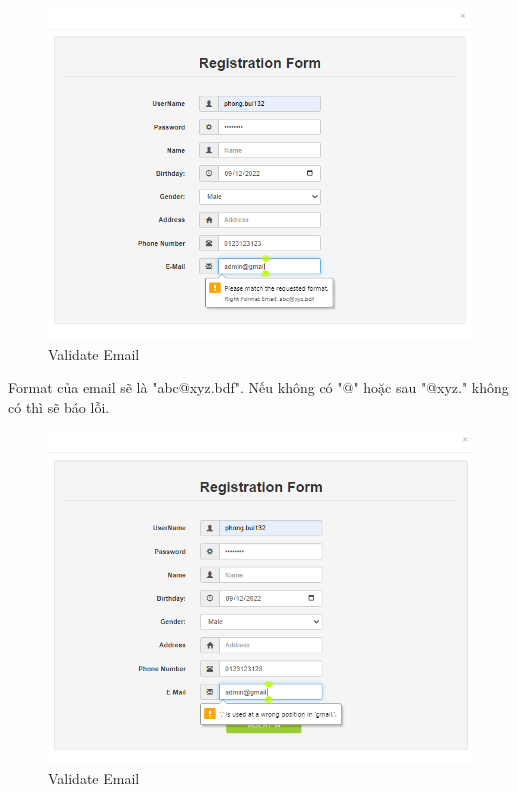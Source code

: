 \begin{figure}[H]
    \centering
    \includegraphics[scale=0.45]{images/validateEmail.png}
    \caption{Validate Email}
\end{figure}
Format của email sẽ là "abc@xyz.bdf". Nếu không có "@" hoặc sau "@xyz." không có thì sẽ báo lỗi.
\begin{figure}[H]
    \centering
    \includegraphics[scale=0.45]{images/validateEmail_02.png}
    \caption{Validate Email}
\end{figure}


